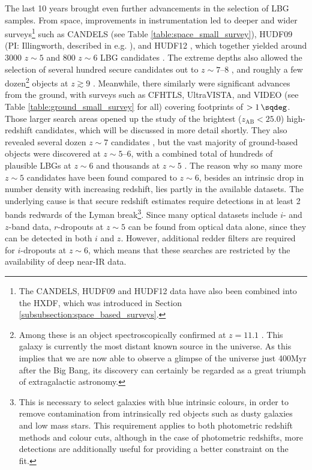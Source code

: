 The last 10 years brought even further advancements in the selection of LBG samples. From space, improvements in instrumentation led to deeper and wider surveys\footnote{The CANDELS, HUDF09 and HUDF12 data have also been combined into the HXDF, which was introduced in Section \ref{subsubsection:space_based_surveys}.} such as CANDELS (see Table \ref{table:space_small_survey}), HUDF09 (PI: Illingworth, described in e.g. \citealt{2011ApJ...737...90B}), and  HUDF12 \citep{2013ApJS..209....3K}, which together yielded around 3000 $z\sim5$ and 800 $z\sim6$ LBG candidates \citep{2015ApJ...810...71F,2015ApJ...803...34B}. The extreme depths also allowed the selection of several hundred secure candidates out to $z\sim7\text{--}8$ \citep{2015ApJ...810...71F,2015ApJ...803...34B}, and roughly a few dozen\footnote{Among these is an object spectroscopically confirmed at $z=11.1$ \citep{2016ApJ...819..129O}. This galaxy is currently the most distant known source in the universe. As this implies that we are now able to observe a glimpse of the universe just 400Myr after the Big Bang, its discovery can certainly be regarded as a great triumph of extragalactic astronomy.} objects at $z\gtrsim9$ \citep{2013ApJ...773...75O,2014ApJ...786..108O,2015ApJ...803...34B}. Meanwhile, there similarly were significant advances from the ground, with surveys such as CFHTLS, UltraVISTA, and VIDEO (see Table \ref{table:ground_small_survey} for all) covering footprints of $>\SI{1}{\sqdeg}$. Those larger search areas opened up the study of the brightest ($z_{\mathrm{AB}}<25.0$) high-redshift candidates, which will be discussed in more detail shortly. They also revealed several dozen $z\sim7$ candidates \citep{2010A&A...524A..28C,2014MNRAS.440.2810B}, but the vast majority of ground-based objects were discovered at $z\sim5\text{--}6$, with a combined total of hundreds of plausible LBGs at $z\sim6$ \citep{2013AJ....145....4W,2015MNRAS.452.1817B,2009MNRAS.395.2196M} and thousands at $z\sim5$ \citep{2009MNRAS.395.2196M,2010A&A...523A..74V}. The reason why so many more $z\sim5$ candidates have been found compared to $z\sim6$, besides an intrinsic drop in number density with increasing redshift, lies partly in the available datasets. The underlying cause is that secure redshift estimates require detections in at least 2 bands redwards of the Lyman break\footnote{This is necessary to select galaxies with blue intrinsic colours, in order to remove contamination from intrinsically red objects such as dusty galaxies and low mass stars. This requirement applies to both photometric redshift methods and colour cuts, although in the case of photometric redshifts, more detections are additionally useful for providing a better constraint on the fit.}. Since many optical datasets include $i$- and $z$-band data, $r$-dropouts at $z\sim5$ can be found from optical data alone, since they can be detected in both $i$ and $z$. However, additional redder filters are required for $i$-dropouts at $z\sim6$, which means that these searches are restricted by the availability of deep near-IR data. \par 

